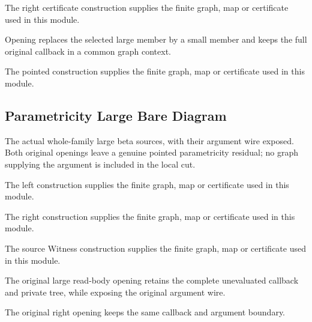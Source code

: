 The right certificate construction supplies the finite graph, map or certificate used in this module.
\par{}

Opening replaces the selected large member by a small member and keeps
the full original callback in a common graph context.
\par{}

The pointed construction supplies the finite graph, map or certificate used in this module.
\par{}

\subsection{Parametricity Large Bare Diagram}
The actual whole-family large beta sources, with their argument wire
exposed. Both original openings leave a genuine pointed parametricity
residual; no graph supplying the argument is included in the local cut.

The left construction supplies the finite graph, map or certificate used in this module.
\par{}

The right construction supplies the finite graph, map or certificate used in this module.
\par{}

The source Witness construction supplies the finite graph, map or certificate used in this module.
\par{}

The original large read-body opening retains the complete unevaluated
callback and private tree, while exposing the original argument wire.
\par{}

The original right opening keeps the same callback and argument boundary.
\par{}

